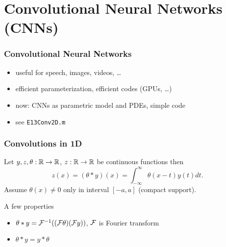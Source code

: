 \documentclass[12pt,fleqn,handout]{beamer}
\begin{document}
\section{Convolutional Neural Networks (CNNs)} %
\label{sec:convolutional_neural_networks}

\begin{frame}\frametitle{Convolutional Neural Networks~\cite{LeCun1990}}
	\begin{center}
	\end{center}
	\begin{itemize}
		\item useful for speech, images, videos, \ldots
		\item efficient parameterization, efficient codes (GPUs, \ldots)
		\item now: CNNs as parametric model and PDEs, simple code
		\item see \texttt{E13Conv2D.m}
	\end{itemize}

\end{frame}

\begin{frame}\frametitle{Convolutions in 1D}
	Let $y, z, \theta:\mathbb{R} \to \mathbb{R}$, $z : \mathbb{R}\to\mathbb{R}$ be continuous functions then
	\begin{equation*}
		z(x) = (\theta * y)(x) = \int_{-\infty}^\infty \theta(x-t) y(t) dt.
	\end{equation*}
	Assume $\theta(x) \neq 0$ only in interval $[-a,a]$ (compact support).
	
	\bigskip
	\pause
	
	A few properties
	\begin{itemize}
	\item $ \theta * y = {\cal F}^{-1}(({\cal F} \theta) ({\cal F} y))$, ${\cal F}$ is Fourier transform
	\item $ \theta * y =  y * \theta$ 
	\end{itemize}
	
	
\end{frame}	
\end{document}
